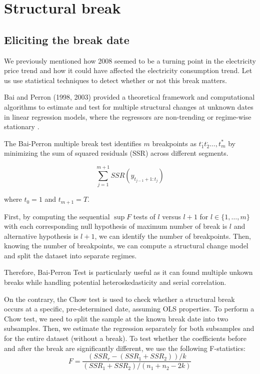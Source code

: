 \section{Structural break}
\subsection{Eliciting the break date}
We previously mentioned how 2008 seemed to be a turning point in the electricity price trend and how it could have affected the electricity consumption trend. Let us use statistical techniques to detect whether or not this break matters. 

Bai and Perron (1998, 2003) provided a theoretical framework and computational algorithms to estimate and test for multiple structural changes at unknown dates in linear regression models, where the regressors are non-trending or regime-wise stationary \cite{bai1998estimating, bai2003computation}. 

The Bai-Perron multiple break test \cite{bai1998estimating} identifies $m$ breakpoints as $t_1^, t_2^, \dots, t_m^*$ by minimizing the sum of squared residuals (SSR) across different segments. 

$$\sum_{j=1}^{m+1} SSR(y_{t_{j-1}+1:t_j})$$

where $t_0 = 1$ and $t_{m+1} = T$. 

First, by computing the sequential $\sup F$ tests of $l$ versus $l+1$ for $l \in \{1, \dots, m\}$ with each corresponding null hypothesis of maximum number of break is $l$ and alternative hypothesis is $l+1$, we can identify the number of breakpoints. Then, knowing the number of breakpoints, we can compute a structural change model and split the dataset into separate regimes. 

Therefore, Bai-Perron Test is particularly useful as it can found multiple unkown breaks while handling potential heteroskedasticity and serial correlation.

On the contrary, the Chow test \cite{chow1960tests} is used to check whether a structural break occurs at a specific, pre-determined date, assuming OLS properties. To perform a Chow test, we need to split the sample at the known break date into two subsamples. Then, we estimate the regression separately for both subsamples and for the entire dataset (without a break). To test whether the coefficients before and after the break are significantly different, we use the following F-statistics:
$$F = \frac{(SSR_r - (SSR_1 + SSR_2)) / k}{(SSR_1 + SSR_2) / (n_1 + n_2 - 2k)}$$

